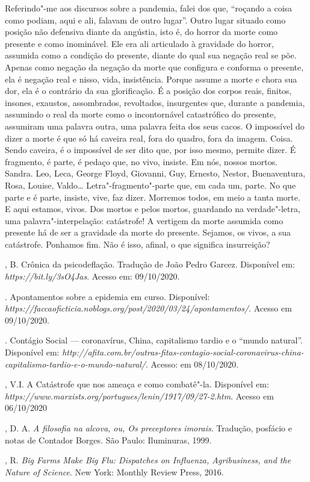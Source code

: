 Referindo"-me aos discursos sobre a pandemia, falei dos que, ``roçando a
coisa como podiam, aqui e ali, falavam de outro lugar''. Outro lugar
situado como posição não defensiva diante da angústia, isto é, do horror
da morte como presente e como inominável. Ele era ali articulado à
gravidade do horror, assumida como a condição do presente, diante do
qual sua negação real se põe. Apenas como negação da negação da morte
que configura e conforma o presente, ela é negação real e nisso, vida,
insistência. Porque assume a morte e chora sua dor, ela é o contrário da
sua glorificação. É a posição dos corpos reais, finitos, insones,
exaustos, assombrados, revoltados, insurgentes que, durante a pandemia,
assumindo o real da morte como o incontornável catastrófico do presente,
assumiram uma palavra outra, uma palavra feita dos seus cacos. O
impossível do dizer a morte é que só há caveira real, fora do quadro,
fora da imagem. Coisa. Sendo caveira, é o impossível de ser dito que,
por isso mesmo, permite dizer. É fragmento, é parte, é pedaço que, no
vivo, insiste. Em nós, nossos mortos. Sandra. Leo, Leca, George Floyd,
Giovanni, Guy, Ernesto, Nestor, Buenaventura, Rosa, Louise,
Valdo\ldots{} Letra"-fragmento"-parte que, em cada um, parte. No que parte
e é parte, insiste, vive, faz dizer. Morremos todos, em meio a tanta
morte. E aqui estamos, vivos. Dos mortos e pelos mortos, guardando na
verdade"-letra, uma palavra"-interpelação: catástrofe! A vertigem da morte
assumida como presente há de ser a gravidade da morte do presente.
Sejamos, os vivos, a sua catástrofe. Ponhamos fim. Não é isso, afinal, o
que significa insurreição?

\begin{bibliohedra}
, B. Crônica da psicodeflação. Tradução de João Pedro Garcez.
Disponível em: \emph{https://bit.ly/3sO4Jas}. Acesso em: 09/10/2020.

. Apontamentos sobre a epidemia em curso.
Disponível:
\emph{https://faccaoficticia.noblogs.org/post/2020/03/24/apontamentos/}.
Acesso em 09/10/2020.

. Contágio Social --- coronavírus, China, capitalismo
tardio e o ``mundo natural''. Disponível em:
\emph{http://afita.com.br/outras-fitas-contagio-social-coronavirus-china-capitalismo-tardio-e-o-mundo-natural/}.
Acesso: em 08/10/2020.

, V.I. A Catástrofe que nos ameaça e como combatê"-la. Disponível
em: \emph{https://www.marxists.org/portugues/lenin/1917/09/27-2.htm}.
Acesso em 06/10/2020

, D. A. \emph{A filosofia na alcova, ou, Os preceptores imorais}.
Tradução, posfácio e notas de Contador Borges. São Paulo: Iluminuras,
1999.

, R. \emph{Big Farms Make Big Flu: Dispatches on Influenza,
Agribusiness, and the Nature of Science}. New York: Monthly Review
Press, 2016.
\end{bibliohedra}

